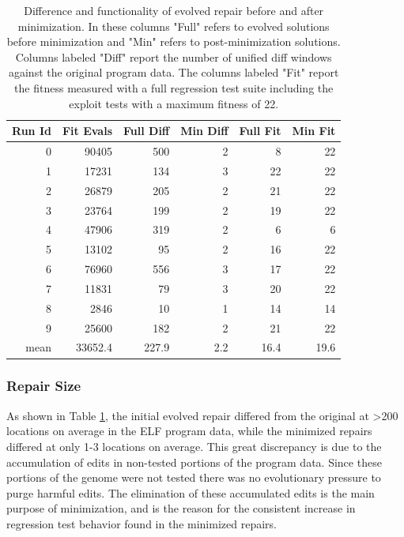\documentclass{sigcomm-alternate}
\begin{document}
\begin{table}[htb]
\centering
\begin{tabular}{rrrrrr}
Run Id & Fit Evals & Full Diff & Min Diff & Full Fit & Min Fit \\
\hline
0      & 90405     & 500       & 2        & 8        & 22      \\
1      & 17231     & 134       & 3        & 22       & 22      \\
2      & 26879     & 205       & 2        & 21       & 22      \\
3      & 23764     & 199       & 2        & 19       & 22      \\
4      & 47906     & 319       & 2        & 6        & 6       \\
5      & 13102     & 95        & 2        & 16       & 22      \\
6      & 76960     & 556       & 3        & 17       & 22      \\
7      & 11831     & 79        & 3        & 20       & 22      \\
8      & 2846      & 10        & 1        & 14       & 14      \\
9      & 25600     & 182       & 2        & 21       & 22      \\
\hline
mean   & 33652.4   & 227.9     & 2.2      & 16.4     & 19.6    \\
\end{tabular}
\caption{\label{minimized-stats}Difference and functionality of
evolved repair before and after minimization.  In these columns "Full"
refers to evolved solutions before minimization and "Min" refers to
post-minimization solutions.  Columns labeled "Diff" report the number
of unified diff windows against the original program data. The columns
labeled "Fit" report the fitness measured with a full regression test
suite including the exploit tests with a maximum fitness of 22.}
\end{table}

\subsubsection{Repair Size}
\label{sec-4-2-3}
As shown in Table \ref{minimized-stats}, the initial evolved repair differed
from the original at >200 locations on average in the ELF program
data, while the minimized repairs differed at only 1-3 locations on
average.  This great discrepancy is due to the accumulation of edits
in non-tested portions of the program data.  Since these portions of
the genome were not tested there was no evolutionary pressure to purge
harmful edits.  The elimination of these accumulated edits is the main
purpose of minimization, and is the reason for the consistent increase
in regression test behavior found in the minimized repairs.
\end{document}
